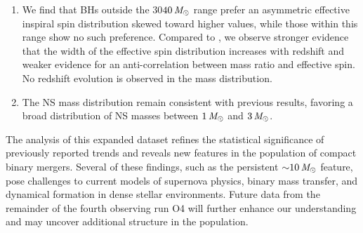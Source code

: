 \begin{enumerate}
	\item We find that \aclp{BH} outside the $30$\textendash$40\,\mathit{M_\odot}$ range prefer an asymmetric effective inspiral spin distribution skewed toward higher values, while those within this range show no such preference. Compared to \gwtcthree, we observe stronger evidence that the width of the effective spin distribution increases with redshift and weaker evidence for an anti-correlation between mass ratio and effective spin. No redshift evolution is observed in the mass distribution.

	\item The \acl{NS} mass distribution remain consistent with previous results, favoring a broad distribution of \acl{NS} masses between $1 \, \mathit{M_\odot}$ and $3 \, \mathit{M_\odot}$.

\end{enumerate}

The analysis of this expanded dataset refines the statistical significance of previously reported trends and reveals new features in the population of compact binary mergers. Several of these findings, such as the persistent  ${\sim} 10\, \mathit{M_\odot}$ feature, pose challenges to current models of supernova physics, binary mass transfer, and dynamical formation in dense stellar environments. Future data from the remainder of the fourth observing run O4 will further enhance our understanding and may uncover additional structure in the population.
